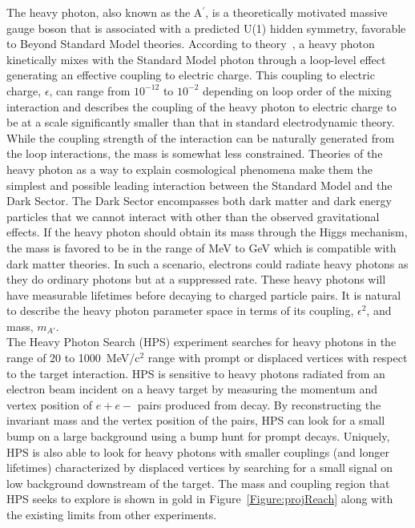 The heavy photon, also known as the A$^{\prime}$, is a theoretically motivated massive gauge boson that is associated with a predicted U(1) hidden symmetry, favorable to Beyond Standard Model theories. According to theory~\cite{holdom_two_1986}, a heavy photon kinetically mixes with the Standard Model photon through a loop-level effect generating an effective coupling to electric charge. This coupling to electric charge, $\epsilon$, can range from $10^{-12}$ to $10^{-2}$ depending on loop order of the mixing interaction and describes the coupling of the heavy photon to electric charge to be at a scale significantly smaller than that in standard electrodynamic theory. While the coupling strength of the interaction can be naturally generated from the loop interactions, the mass is somewhat less constrained. Theories of the heavy photon as a way to explain cosmological phenomena make them the simplest and possible leading interaction between the Standard Model and the Dark Sector. The Dark Sector encompasses both dark matter and dark energy particles that we cannot interact with other than the observed gravitational effects. If the heavy photon should obtain its mass through the Higgs mechanism, the mass is favored to be in the range of MeV to GeV which is compatible with dark matter theories. In such a scenario, electrons could radiate heavy photons as they do ordinary photons but at a suppressed rate. These heavy photons will have measurable lifetimes before decaying to charged particle pairs. It is natural to describe the heavy photon parameter space in terms of its coupling, $\epsilon^2$, and mass, $m_{A'}$. \\
\indent The Heavy Photon Search (HPS) experiment searches for heavy photons in the range of 20 to 1000~MeV/c$^2$ range with prompt or displaced vertices with respect to the target interaction. HPS is sensitive to heavy photons radiated from an electron beam incident on a heavy target by measuring the momentum and vertex position of $e+e-$ pairs produced from decay. By reconstructing the invariant mass and the vertex position of the pairs, HPS can look for a small bump on a large background using a bump hunt for prompt decays. Uniquely, HPS is also able to look for heavy photons with smaller couplings (and longer lifetimes) characterized by displaced vertices by searching for a small signal on low background downstream of the target. The mass and coupling region that HPS seeks to explore is shown in gold in Figure~\ref{Figure:projReach} along with the existing limits from other experiments. 

